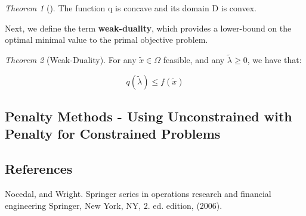 \documentclass[class=article, crop=false]{standalone}
\theoremstyle{definition}
\theoremstyle{remark}
\theoremstyle{lemma}
\theoremstyle{theorem}
\newtheorem*{theorem}{Theorem}
\theoremstyle{corollary}
\theoremstyle{property}
\begin{document}
			\begin{theorem} []
				The function q is concave and its domain D is convex.
			\end{theorem}

			Next, we define the term \textbf{weak-duality}, which provides a lower-bound on the optimal minimal value to the primal objective problem. 

			\begin{theorem} [Weak-Duality]
				For any $\tilde{x} \in \Omega$ feasible, and any $\tilde{\lambda} \ge 0$, we have that:

					$$q(\tilde{\lambda}) \le f(\tilde{x})$$
			\end{theorem}
	\subsection{Penalty Methods - Using Unconstrained with Penalty for Constrained Problems}

		

	\subsection{References}
		Nocedal, and Wright. Springer series in operations research and financial engineering Springer, New York, NY, 2. ed. edition, (2006).
\end{document}
